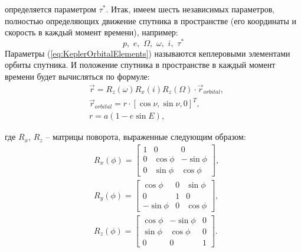 определяется параметром $\tau^*$. Итак, имеем шесть независимых параметров, полностью
определяющих движение спутника в пространстве (его координаты и скорость в каждый
момент времени), например:
\begin{equation} \label{eq:KeplerOrbitalElements}
  p,\,\, e,\,\, \Omega,\,\, \omega,\,\, i,\,\, \tau^*
\end{equation}
Параметры (\ref{eq:KeplerOrbitalElements}) называются кеплеровыми элементами
орбиты спутника.
И положение спутника в пространстве в каждый момент времени будет вычисляться по формуле:
\begin{equation}
  \begin{aligned}
    & \vec{r} = R_z(\omega)R_x(i)R_z(\Omega) \cdot \vec{r}_{orbital}, \\
    & \vec{r}_{orbital} = r \cdot [\cos\nu, \sin\nu, 0]^{T}, \\
    & r = a(1 - e\sin E),
  \end{aligned}
\end{equation}\par
где $R_x$, $R_z$ -- матрицы поворота, выраженные следующим образом:
\begin{equation}
  \begin{aligned}
    & R_x(\phi) = \begin{bmatrix}
       1        &  0        &   0        \\
       0        &  \cos\phi &  -\sin\phi \\
       0        &  \sin\phi &   \cos\phi
    \end{bmatrix}, \\
    & R_y(\phi) = \begin{bmatrix}
       \cos\phi &  0        &  \sin\phi \\
       0        &  1        &  0        \\
      -\sin\phi &  0        &  \cos\phi
    \end{bmatrix}, \\
    & R_z(\phi) = \begin{bmatrix}
      \cos\phi & -\sin\phi & 0 \\
      \sin\phi &  \cos\phi & 0 \\
      0        &  0        & 1
    \end{bmatrix}.
  \end{aligned}
\end{equation}

